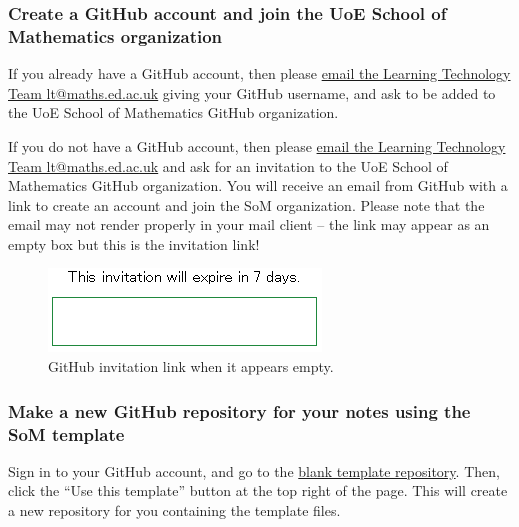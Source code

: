 \subsubsection{Create a GitHub account and join the UoE School of Mathematics organization}

If you already have a GitHub account, then please \href{mailto:lt@maths.ed.ac.uk?subject=Please%20add%20me%20to%20SoM%20GitHub%20organization}{email the Learning Technology Team lt@maths.ed.ac.uk} giving your GitHub username, and ask to be added to the UoE School of Mathematics GitHub organization. 

If you do not have a GitHub account, then please \href{mailto:lt@maths.ed.ac.uk?subject=Please%20add%20me%20to%20SoM%20GitHub%20organization}{email the Learning Technology Team lt@maths.ed.ac.uk} and ask for an invitation to the UoE School of Mathematics GitHub organization. You will receive an email from GitHub with a link to create an account and join the SoM organization. Please note that the email may not render properly in your mail client -- the link may appear as an empty box but this is the invitation link!


\begin{figure}[h]
    \centering
    \includegraphics{img/GitHub-invitation.png}
    \caption{GitHub invitation link when it appears empty.}
    \label{fig:gh-invitation}
\end{figure}


\subsubsection{Make a new GitHub repository for your notes using the SoM template}

Sign in to your GitHub account, and go to the \href{https://github.com/UoE-School-of-Mathematics/Workflow-Template-Blank}{blank template repository}. Then, click the ``Use this template'' button at the top right of the page. This will create a new repository for you containing the template files.

